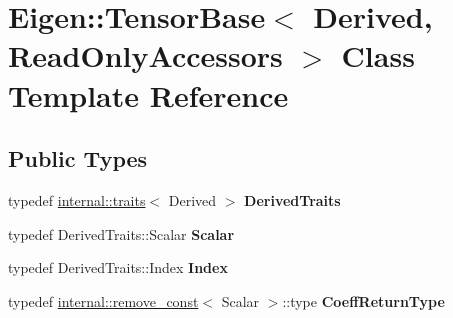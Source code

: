 \hypertarget{class_eigen_1_1_tensor_base_3_01_derived_00_01_read_only_accessors_01_4}{}\section{Eigen\+:\+:Tensor\+Base$<$ Derived, Read\+Only\+Accessors $>$ Class Template Reference}
\label{class_eigen_1_1_tensor_base_3_01_derived_00_01_read_only_accessors_01_4}
\subsection*{Public Types}
\begin{DoxyCompactItemize}
\item 
\mbox{\label{class_eigen_1_1_tensor_base_3_01_derived_00_01_read_only_accessors_01_4_a292a4dd3e8e0c195973868c239458d60}} 
typedef \hyperlink{struct_eigen_1_1internal_1_1traits}{internal\+::traits}$<$ Derived $>$ {\bfseries Derived\+Traits}
\item 
\mbox{\label{class_eigen_1_1_tensor_base_3_01_derived_00_01_read_only_accessors_01_4_a520c9879a53ac886a6f4b7f7914bffcd}} 
typedef Derived\+Traits\+::\+Scalar {\bfseries Scalar}
\item 
\mbox{\label{class_eigen_1_1_tensor_base_3_01_derived_00_01_read_only_accessors_01_4_a37fa2d34e33136cf733faa6820b22907}} 
typedef Derived\+Traits\+::\+Index {\bfseries Index}
\item 
\mbox{\label{class_eigen_1_1_tensor_base_3_01_derived_00_01_read_only_accessors_01_4_a7742e4e20415b2f9e8a564f3994e44c6}} 
typedef \hyperlink{struct_eigen_1_1internal_1_1remove__const}{internal\+::remove\+\_\+const}$<$ Scalar $>$\+::type {\bfseries Coeff\+Return\+Type}
\item 
\mbox{\label{class_eigen_1_1_tensor_base_3_01_derived_00_01_read_only_accessors_01_4_a2a36349a2c90ff790ca85541f8c16b85}} 

\end{DoxyCompactItemize}
